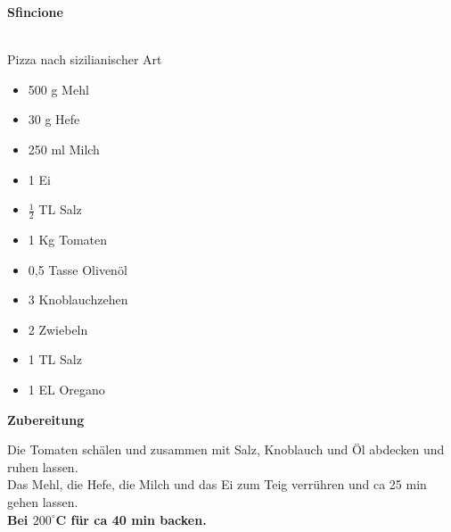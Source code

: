 
\parindent0pt	

\pagestyle{empty}


\textbf{{\LARGE Sfincione}}%


\hrulefill\\
Pizza nach sizilianischer Art
\vspace*{\fill}


\begin{multicols}{2}	


\begin{itemize}
\item 500 g Mehl
\item 30 g Hefe
\item 250 ml Milch
\item 1 Ei
\item $\frac{1}{2}$ TL Salz
\item 1 Kg Tomaten
\item 0,5 Tasse Olivenöl
\item 3 Knoblauchzehen
\item 2 Zwiebeln
\item 1 TL Salz
\item 1 EL Oregano
\end{itemize}

\end{multicols}
\vfill
\newpage
\textbf{{\LARGE Zubereitung}}%

\hrulefill

\vspace*{\fill}
\begin{multicols}{2}


Die Tomaten schälen und zusammen mit Salz, Knoblauch und Öl abdecken und ruhen lassen.\\
Das Mehl, die Hefe, die Milch und das Ei zum Teig verrühren und ca 25 min gehen lassen.\\

\textbf{Bei $200^\circ$C für ca 40 min backen.}



\end{multicols}
\vfill
